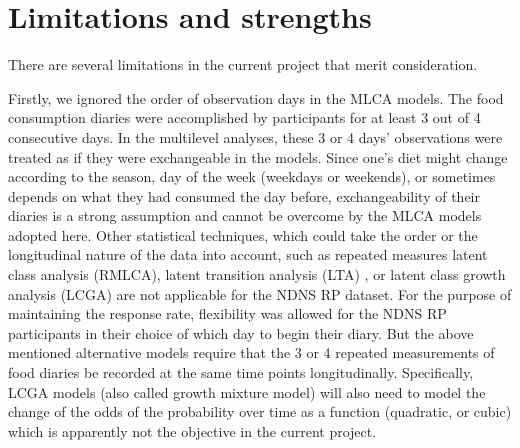 










\section{Limitations and strengths}

There are several limitations in the current project that merit consideration.  

Firstly, we ignored the order of observation days in the MLCA models. The food consumption diaries were accomplished by participants for at least 3 out of 4 consecutive days. In the multilevel analyses, these 3 or 4 days' observations were treated as if they were exchangeable in the models. Since one's diet might change according to the season, day of the week (weekdays or weekends), or sometimes depends on what they had consumed the day before, exchangeability of their diaries is a strong assumption and cannot be overcome by the MLCA models adopted here. Other statistical techniques, which could take the order or the longitudinal nature of the data into account, such as repeated measures latent class analysis (RMLCA), latent transition analysis (LTA) \parencite{collins2010latent}, or latent class growth analysis (LCGA) \parencite{davidian2008growth,jung2008introduction,andruff2009latent} are not applicable for the NDNS RP dataset. For the purpose of maintaining the response rate, flexibility was allowed for the NDNS RP participants in their choice of which day to begin their diary. But the above mentioned alternative models require that the 3 or 4 repeated measurements of food diaries be recorded at the same time points longitudinally. Specifically, LCGA models (also called growth mixture model) will also need to model the change of the odds of the probability over time as a function (quadratic, or cubic) which is apparently not the objective in the current project. 

